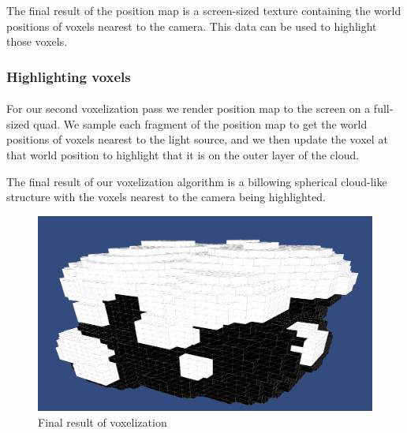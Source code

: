 The final result of the position map is a screen-sized texture containing the world positions of voxels nearest to the camera. This data can be used to highlight those voxels.

\subsubsection{Highlighting voxels}\paragraph{}
For our second voxelization pass we render position map to the screen on a full-sized quad. 
We sample each fragment of the position map to get the world positions of voxels nearest to the light source, and we then update the voxel at that world position to highlight that it is on the outer layer of the cloud. 

The final result of our voxelization algorithm is a billowing spherical cloud-like structure with the voxels nearest to the camera being highlighted. 


\begin{figure}[h]
\centering
\includegraphics[width=\textwidth]{../res/billowing.png}
\caption{Final result of voxelization}
\end{figure}

